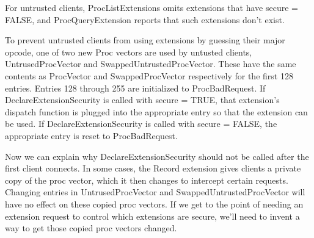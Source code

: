 For untrusted clients, ProcListExtensions omits extensions that have
secure = FALSE, and ProcQueryExtension reports that such extensions
don't exist.

To prevent untrusted clients from using extensions by guessing their
major opcode, one of two new Proc vectors are used by untusted
clients, UntrusedProcVector and SwappedUntrustedProcVector.  These
have the same contents as ProcVector and SwappedProcVector
respectively for the first 128 entries.  Entries 128 through 255 are
initialized to ProcBadRequest.  If DeclareExtensionSecurity is called
with secure = TRUE, that extension's dispatch function is plugged
into the appropriate entry so that the extension can be used.  If
DeclareExtensionSecurity is called with secure = FALSE, the
appropriate entry is reset to ProcBadRequest.

Now we can explain why DeclareExtensionSecurity should not be called
after the first client connects.  In some cases, the Record extension
gives clients a private copy of the proc vector, which it then changes
to intercept certain requests.  Changing entries in UntrusedProcVector
and SwappedUntrustedProcVector will have no effect on these copied
proc vectors.  If we get to the point of needing an extension request
to control which extensions are secure, we'll need to invent a way to
get those copied proc vectors changed.


